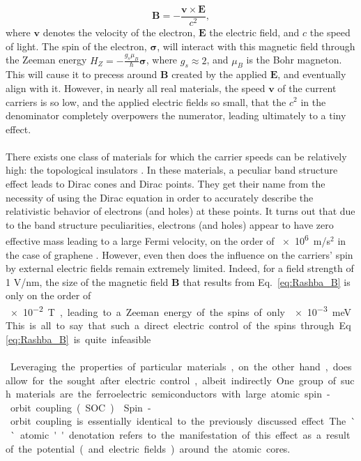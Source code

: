 \begin{equation}
	\label{eq:Rashba_B}
	\bm{B} = - \frac{\bm v \times \bm E}{c^2},
\end{equation}
where $\bm v$ denotes the velocity of the electron, $\bm E$ the electric field, and $c$ the speed of light.
The spin of the electron, $\bm{\sigma}$, will interact with this magnetic field through the Zeeman energy $H_Z = -\frac{g_s\mu_B}{\hbar} \bm{\sigma}$, where $g_s \approx 2$, and $\mu_B$ is the Bohr magneton.
This will cause it to precess around $\bm B$ created by the applied $\bm E$, and eventually align with it.
However, in nearly all real materials, the speed $\bm v$ of the current carriers is so low, and the applied electric fields so small, that the $c^2$ in the denominator completely overpowers the numerator, leading ultimately to a tiny effect.
\\\\
There exists one class of materials for which the carrier speeds can be relatively high: the topological insulators \cite{Kane2005a,Novoselov2005,CastroNeto2009,Fu2007,Fu2006,Pesin2012}.
In these materials, a peculiar band structure effect leads to Dirac cones and Dirac points. They get their name from the necessity of using the Dirac equation in order to accurately describe the relativistic behavior of electrons (and holes) at these points.
It turns out that due to the band structure peculiarities, electrons (and holes) appear to have zero effective mass leading to a large Fermi velocity, on the order of \SI{e6}m/s$^2$ in the case of graphene \cite{Novoselov2005}.   
However, even then does the influence on the carriers' spin by external electric fields remain extremely limited.
Indeed, for a field strength of 1 V/nm, the size of the magnetic field $\bm B$ that results from Eq.~\eqref{eq:Rashba_B} is only on the order of \SI{e-2} T, leading to a Zeeman energy of the spins of only \SI{e-3} meV.
This is all to say that such a direct electric control of the spins through Eq.~\eqref{eq:Rashba_B} is quite infeasible.
\\\\
Leveraging the properties of particular materials, on the other hand, does allow for the sought after electric control, albeit indirectly.
One group of such materials are the ferroelectric semiconductors with large atomic spin-orbit coupling (SOC) \cite{Picozzi2014,DiSante2013,Ishizaka2011,Kim2014}.
Spin-orbit coupling is essentially identical to the previously discussed effect.
The ``atomic'' denotation refers to the manifestation of this effect as a result of the potential (and electric fields) around the atomic cores.
